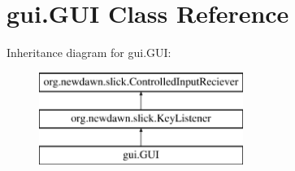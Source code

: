 \hypertarget{classgui_1_1_g_u_i}{}\section{gui.\+G\+UI Class Reference}
\label{classgui_1_1_g_u_i}
Inheritance diagram for gui.\+G\+UI\+:\begin{figure}[H]
\begin{center}
\leavevmode
\includegraphics[height=3.000000cm]{classgui_1_1_g_u_i}
\end{center}
\end{figure}
